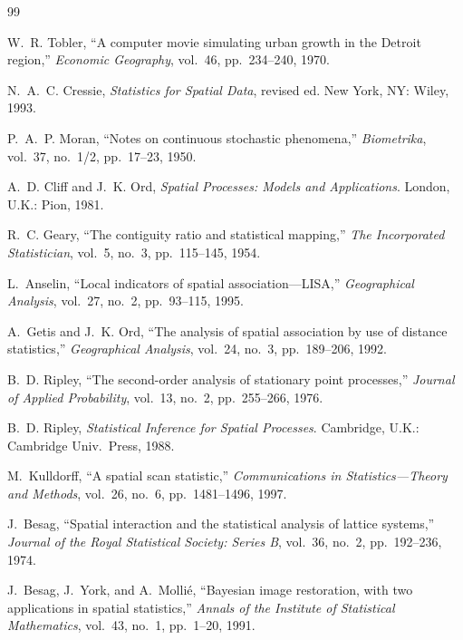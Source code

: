 \documentclass[conference]{IEEEtran}
\theoremstyle{definition}
\begin{document}

\begin{thebibliography}{99}

W.~R. Tobler, ``A computer movie simulating urban growth in the Detroit region,'' \emph{Economic Geography}, vol.~46, pp.~234--240, 1970.

N.~A.~C. Cressie, \emph{Statistics for Spatial Data}, revised ed. New York, NY: Wiley, 1993.

P.~A.~P. Moran, ``Notes on continuous stochastic phenomena,'' \emph{Biometrika}, vol.~37, no.~1/2, pp.~17--23, 1950.

A.~D. Cliff and J.~K. Ord, \emph{Spatial Processes: Models and Applications}. London, U.K.: Pion, 1981.

R.~C. Geary, ``The contiguity ratio and statistical mapping,'' \emph{The Incorporated Statistician}, vol.~5, no.~3, pp.~115--145, 1954.

L.~Anselin, ``Local indicators of spatial association---LISA,'' \emph{Geographical Analysis}, vol.~27, no.~2, pp.~93--115, 1995.

A.~Getis and J.~K. Ord, ``The analysis of spatial association by use of distance statistics,'' \emph{Geographical Analysis}, vol.~24, no.~3, pp.~189--206, 1992.

B.~D. Ripley, ``The second-order analysis of stationary point processes,'' \emph{Journal of Applied Probability}, vol.~13, no.~2, pp.~255--266, 1976.

B.~D. Ripley, \emph{Statistical Inference for Spatial Processes}. Cambridge, U.K.: Cambridge Univ.\ Press, 1988.

M.~Kulldorff, ``A spatial scan statistic,'' \emph{Communications in Statistics---Theory and Methods}, vol.~26, no.~6, pp.~1481--1496, 1997.

J.~Besag, ``Spatial interaction and the statistical analysis of lattice systems,'' \emph{Journal of the Royal Statistical Society: Series B}, vol.~36, no.~2, pp.~192--236, 1974.

J.~Besag, J.~York, and A.~Molli\'{e}, ``Bayesian image restoration, with two applications in spatial statistics,'' \emph{Annals of the Institute of Statistical Mathematics}, vol.~43, no.~1, pp.~1--20, 1991.


\end{thebibliography}
\end{document}
